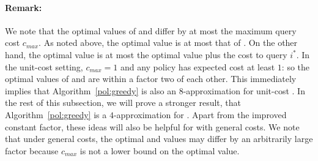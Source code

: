 \documentclass[11pt]{article}
\theoremstyle{remark}
\theoremstyle{plain}
\theoremstyle{remark}
\begin{document}
\paragraph{Remark:} We note that the optimal values of \smq and \smqi differ by at most the maximum query cost $c_{max}$. As noted above, the optimal \smqi value is at most that of \smq. On the other hand, the optimal \smq value is at most the optimal \smqi value plus the cost to query $i^*$. In the unit-cost setting, $c_{max}=1$ and any policy has expected cost at least $1$: so  the optimal  values of \smq and \smqi are within a factor two of each other.  This immediately implies that Algorithm~\ref{pol:greedy}  is also  an $8$-approximation   for unit-cost \smqi. In the rest of this subsection,  we will prove a stronger result, that  Algorithm~\ref{pol:greedy}  is a $4$-approximation for \smqi. Apart from the improved constant factor, these ideas  will also be helpful for \smqi with general costs. We note that under general costs, the optimal \smq and \smqi values may differ by an arbitrarily large factor because $c_{max}$ is not a lower bound on the optimal value.


 
\end{document}
